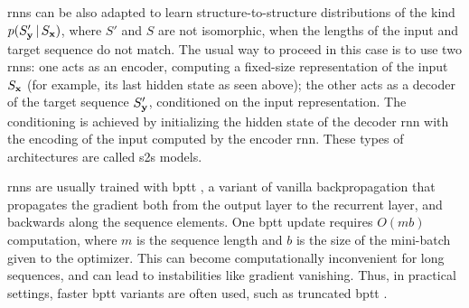 \glspl{rnn} can be also adapted to learn structure-to-structure distributions of the kind $p(S'_\Vector{y} \given S_\Vector{x})$, where $S'$ and $S$ are not isomorphic, \ie when the lengths of the input and target sequence do not match. The usual way to proceed in this case is to use two \glspl{rnn}: one acts as an encoder, computing a fixed-size representation of the input $S_\Vector{x}$ (for example, its last hidden state as seen above); the other acts as a decoder of the target sequence $S'_\Vector{y}$, conditioned on the input representation. The conditioning is achieved by initializing the hidden state of the decoder \gls{rnn} with the encoding of the input computed by the encoder \gls{rnn}. These types of architectures are called \gls{s2s} models.

\glspl{rnn} are usually trained with \gls{bptt} \citep{werbos1988backpropthroughtime}, a variant of vanilla backpropagation that propagates the gradient both from the output layer to the recurrent layer, and backwards along the sequence elements. One \gls{bptt} update requires $O(mb)$ computation, where $m$ is the sequence length and $b$ is the size of the mini-batch given to the optimizer. This can become computationally inconvenient for long sequences, and can lead to instabilities like gradient vanishing. Thus, in practical settings, faster \gls{bptt} variants are often used, such as truncated \gls{bptt} \citep{jaeger2002truncatedbptt}.

